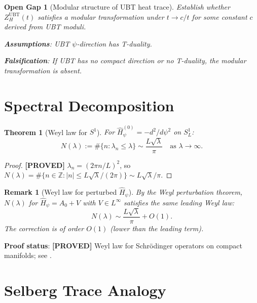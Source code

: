 \documentclass[11pt,a4paper]{article}
\newtheorem{theorem}{Theorem}
\newtheorem{remark}{Remark}
\newtheorem{gap}{Open Gap}
\newcommand{\proved}[1]{\textbf{[PROVED]} #1}
\begin{document}
\begin{gap}[Modular structure of UBT heat trace]
  \label{gap:modular}
  Establish whether $Z_H^\mathrm{UBT}(t)$ satisfies a modular transformation
  under $t \to c/t$ for some constant $c$ derived from UBT moduli.

  \textbf{Assumptions}: UBT $\psi$-direction has T-duality.

  \textbf{Falsification}: If UBT has no compact direction or no T-duality,
  the modular transformation is absent.
\end{gap}

\section{Spectral Decomposition}

\begin{theorem}[Weyl law for $S^1$]
  For $\hat{H}_\psi^{(0)} = -d^2/d\psi^2$ on $S^1_L$:
  \[
    N(\lambda) := \#\{n : \lambda_n \leq \lambda\}
    \sim \frac{L\sqrt{\lambda}}{\pi} \quad \text{as } \lambda \to \infty.
  \]
\end{theorem}

\begin{proof}
  \proved{} $\lambda_n = (2\pi n/L)^2$, so $N(\lambda) = \#\{n \in \mathbb{Z} : |n| \leq L\sqrt{\lambda}/(2\pi)\} \sim L\sqrt{\lambda}/\pi$.
\end{proof}

\begin{remark}[Weyl law for perturbed $\hat{H}_\psi$]
  By the Weyl perturbation theorem, $N(\lambda)$ for $\hat{H}_\psi = A_0 + V$
  with $V \in L^\infty$ satisfies the same leading Weyl law:
  \[
    N(\lambda) \sim \frac{L\sqrt{\lambda}}{\pi} + O(1).
  \]
  The correction is of order $O(1)$ (lower than the leading term).
\end{remark}

\textbf{Proof status}: \proved{Weyl law for Schr\"odinger operators on compact
manifolds; see \cite[Ch.\ 13]{Berger}.}

\section{Selberg Trace Analogy}
\end{document}
